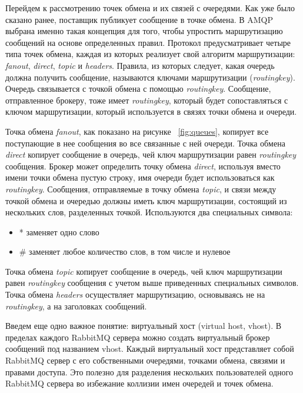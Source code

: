 Перейдем к рассмотрению точек обмена и их связей с очередями. Как уже было сказано ранее, поставщик публикует сообщение в точке обмена. В AMQP выбрана именно такая концепция для того, чтобы упростить маршрутизацию сообщений на основе определенных правил. Протокол предусматривает четыре типа точек обмена, каждая из которых реализует свой алгоритм маршрутизации: \textit{fanout}, \textit{direct}, \textit{topic} и \textit{headers}. Правила, из которых следует, какая очередь должна получить сообщение, называются ключами маршрутизации (\textit{routing\underline{\hspace{0.25cm}}key}). Очередь связывается с точкой обмена с помощью \textit{routing\underline{\hspace{0.25cm}}key}. Сообщение, отправленное брокеру, тоже имеет  \textit{routing\underline{\hspace{0.25cm}}key}, который будет сопоставляться с ключом маршрутизации, который используется в связях точки обмена и очереди.

Точка обмена \textit{fanout}, как показано на рисунке ~\ref{fig:queues}, копирует все поступающие в нее сообщения во все связанные с ней очереди. Точка обмена \textit{direct} копирует сообщение в очередь, чей ключ маршрутизации равен \textit{routing\underline{\hspace{0.25cm}}key} сообщения. Брокер может определить точку обмена \textit{direct}, используя вместо имени точки обмена пустую строку, имя очереди будет использоваться как \textit{routing\underline{\hspace{0.25cm}}key}. Сообщения, отправляемые в точку обмена \textit{topic}, и связи между точкой обмена и очередью должны иметь ключ маршрутизации, состоящий из нескольких слов, разделенных точкой. Используются два специальных символа:
\begin{itemize}
\item * заменяет одно слово
\item \# заменяет любое количество слов, в том числе и нулевое
\end{itemize}
Точка обмена \textit{topic} копирует сообщение в очередь, чей ключ маршрутизации равен \textit{routing\underline{\hspace{0.25cm}}key} сообщения с учетом выше приведенных специальных символов. Точка обмена \textit{headers} осуществляет маршрутизацию, основываясь не на \textit{routing\underline{\hspace{0.25cm}}key}, а на заголовках сообщений.

Введем еще одно важное понятие: виртуальный хост (virtual host, vhost). В пределах каждого RabbitMQ сервера можно создать виртуальный брокер сообщений под названием vhost. Каждый виртуальный хост представляет собой RabbitMQ сервер с его собственными очередями, точками обмена, связями и правами доступа. Это полезно для разделения нескольких пользователей одного RabbitMQ сервера во избежание коллизии имен очередей и точек обмена. 
